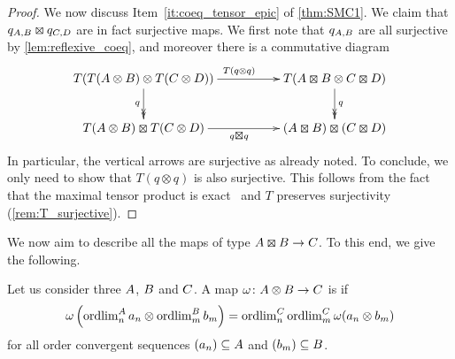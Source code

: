 \begin{proof}
	We now discuss Item~\ref{it:coeq_tensor_epic} of \cref{thm:SMC1}.
	We claim that $q_{\A,\B}\kocktensor q_{\C,\D}$ are in fact surjective maps.
	We first note that $q_{{A},{B}}$ are all surjective by \cref{lem:reflexive_coeq}, and moreover there is a commutative diagram
	\[
		\xymatrix@C=5em{
		T(T(\A\otimes \B) \otimes T(\C\otimes \D))
		\ar[r]^{T(q\otimes q)}
		\ar@{->>}[d]_{q}
		&
		T(\A\kocktensor \B \otimes \C\kocktensor \D)
		\ar@{->>}[d]^{q}
		\\
		T(\A\otimes \B) \kocktensor T(\C\otimes \D)
		\ar[r]_{q\kocktensor q}
		&
		(\A\kocktensor \B) \kocktensor (\C\kocktensor \D)
		}
	\]
	In particular, the vertical arrows are surjective as already noted.
	To conclude, we only need to show that $T(q\otimes q)$ is also surjective. This follows from the fact that the maximal tensor product is exact~\cite[Proposition 3.7.1]{brownozawa} and $T$ preserves surjectivity (\cref{rem:T_surjective}).
\end{proof}


We now aim to describe all the \scpu{} maps of type $\A\kocktensor \B\to \C$.
To this end, we give the following.
\begin{definition}\label{def:bisigmanormal}
	Let us consider three \cstars{} ${A}$, ${B}$ and ${C}$. A \cpu{} map $\omega\colon {A} \otimes {B} \to {C}$ is  if
	\[
		\omega\left( \operatorname{ordlim}_n^{{A}} a_n \otimes \operatorname{ordlim}_m^{{B}} b_m \right) = \operatorname{ordlim}_n^{{C}} \operatorname{ordlim}_m^{{C}} \omega(a_n \otimes b_m)
	\]
	for all order convergent sequences $(a_n)\subseteq {A}$ and $(b_m)\subseteq {B}$.
\end{definition}

